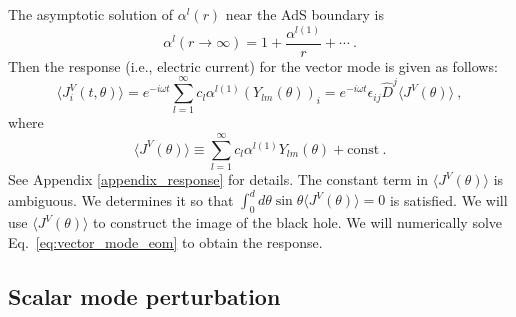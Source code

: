 \documentclass[a4paper,11pt]{article}
\begin{document}
    The asymptotic solution of $\alpha^l(r)$ near the AdS boundary is 
    \begin{equation}
        \label{eq:vector_mode_asmp}
        \alpha^l(r\to\infty)
        =1+\frac{\alpha^{l(1)}}{r}+\cdots\ .
    \end{equation}
    Then the response (i.e., electric current) for the vector mode is given as follows:
    \begin{equation}
        \label{eq:vector_mode_response}
        \langle J^V_i(t,\theta)\rangle
        = e^{-i \omega t} \sum_{l=1}^\infty c_{l} \alpha^{l(1)} \left(Y_{lm}(\theta)\right)_i
        = e^{-i \omega t} \epsilon_{ij}\hat{D}^j  \langle J^V(\theta)\rangle\ ,
    \end{equation}
    where
    \begin{equation}
        \langle J^V(\theta)\rangle \equiv  \sum_{l=1}^\infty c_{l} \alpha^{l(1)} Y_{lm}(\theta) + \textrm{const}\ .
    \end{equation}
    See Appendix \ref{appendix_response} for details. 
    The constant term in $\langle J^V(\theta)\rangle$ is ambiguous.
    We determines it so that $\int_0^d d\theta \sin\theta \langle J^V(\theta)\rangle = 0$ is satisfied.
    We will use $\langle J^V(\theta) \rangle$  to construct the image of the black hole.
    We will numerically solve Eq.~\eqref{eq:vector_mode_eom} to obtain the response.


\subsection{Scalar mode perturbation}
\end{document}
